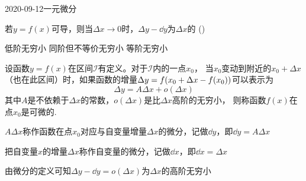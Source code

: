 \documentclass{ctexart}
\begin{document}
\begin{mathques}{2020-09-12}{一元微分}
\begin{ques}
  若$y = f(x)$可导，则当$\Delta x \to 0$时，$\Delta y - \dd y$为$\Delta x$的
  (\quad)
  \begin{multichoice}
    \task {}
    \task 低阶无穷小
    \task 同阶但不等价无穷小
    \task 等阶无穷小
  \end{multichoice}
\end{ques}
\begin{solu}
  \begin{mathideabox}[微分定义]
    设函数$y = f(x)$在区间$\mathcal{I}$有定义。对于$\mathcal{I}$内的一点$x_0$，
    当$x_0$变动到附近的$x_0 + \Delta x$（也在此区间）时，如果函数的增量$\Delta
    y = f\qty(x_0 + \Delta x - f(x_0))$可以表示为
    \[
      \Delta y = A\Delta x + o(\Delta x)
    \]
    其中$A$是不依赖于$\Delta x$的常数，$o(\Delta x)$是比$\Delta x$高阶的无穷小，
    则称函数$f(x)$在点$x_0$是可微的.

    $A\Delta x$称作函数在点$x_0$对应与自变量增量$\Delta x$的微分，记做$\dd
    y$，即$\dd y = A\Delta x$

    把自变量$x$的增量$\Delta x$称作自变量的微分，记做$\dd x$，即$\dd x =
    \Delta x$
  \end{mathideabox}
  由微分的定义可知$\Delta y - \dd y = o(\Delta x)$为$\Delta x$的高阶无穷小
\end{solu}
\end{mathques}
\end{document}
